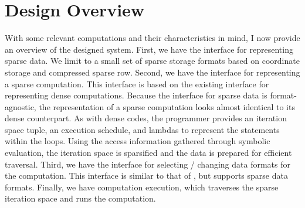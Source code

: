 \begin{comment}
  //fill upper triangle with zeroes
  for(i0 = 0; i0 < N; i0++) {
    for(i1 = i0+1; i1 < N; i1++) {
      A(i0,i1) = 0;
    }
  }
  \end{lstlisting}
  \end{figure}

Figures~\ref{DenseMV} and~\ref{SparseMV} show C-like implementations of the SpMV kernel using dense and sparse data formats, respectively.
Consider the extent to which the representations of the computations depend on the selected data format.
In the sparse implementation, the data format of \verb.A. changes not only the access to \verb.A., but also the bounds of the inner loop and even the access to the other data in the computation (\verb.x.).
All parts of the computation description have been tied up with the format of just one of the arrays.
This means that changes to the format of \verb.A. will require modifying nearly all parts of the computation, significantly reducing the flexibility of the code. 





\begin{figure}
\begin{lstlisting}[caption={C-like implementation of sparse matrix vector multiplication using compressed sparse row (CSR) format.}, label=SparseMV]
SparseView<2,CSR> A(Ni,Nj);
View<1> x(Nj);
View<1> y(Ni);

for(int i = 0; i < Ni; i++) {
  startIndex = A.rowptr(i);
  endIndex = A.rowptr(i+1);
  for(int j = startIndex; j < endIndex; j++) {
    y(i) += A.values(j) * x(A.col(j));
  }
})
\end{lstlisting}
\end{figure}

\end{comment}

\section{Design Overview}

With some relevant computations and their characteristics in mind, I now provide an overview of the designed system.
First, we have the interface for representing sparse data. 
We limit to a small set of sparse storage formats based on coordinate storage and compressed sparse row.
Second, we have the interface for representing a sparse computation.
This interface is based on the existing interface for representing dense computations.
Because the interface for sparse data is format-agnostic, the representation of a sparse computation looks almost identical to its dense counterpart.
As with dense codes, the programmer provides an iteration space tuple, an execution schedule, and lambdas to represent the statements within the loops.
Using the access information gathered through symbolic evaluation, the iteration space is sparsified and the data is prepared for efficient traversal.
Third, we have the interface for selecting / changing data formats for the computation. 
This interface is similar to that of \FormatDecisions, but supports sparse data formats.
Finally, we have computation execution, which traverses the sparse iteration space and runs the computation. 

